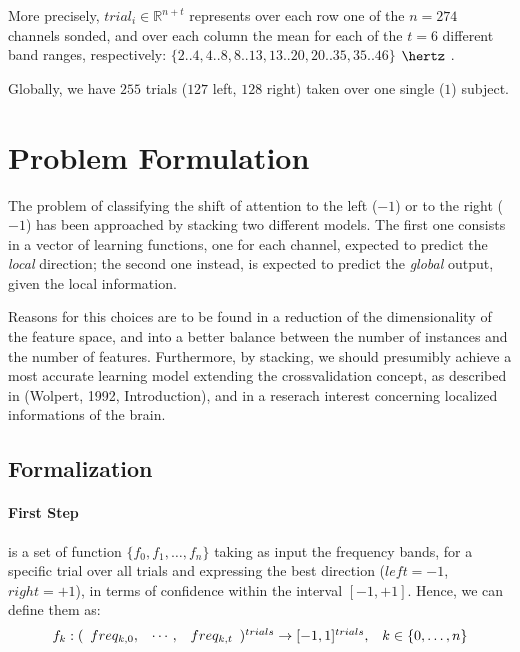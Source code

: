 \documentclass[10pt]{article}
\begin{document}
More precisely, $trial_i \in \mathbb{R} ^{n+t}$ represents over each row one of the $n=274$ channels sonded, and over each column the mean for each of the $t=6$ different band ranges, respectively:
$\{2..4, 4..8, 8..13, 13..20, 20..35, 35..46\}$ $\hertz$ .

Globally, we have $255$ trials ($127$ left, $128$ right) taken over one single ($1$) subject.  


\section{Problem Formulation}
The problem of classifying the shift of attention to
the left ($-1$) or to the right ($-1$) has been
approached by stacking\cite{Wolpert92} two different
models. The first one consists in a vector of
learning functions, one for each channel, expected to
predict the \emph{local} direction; the second one
instead, is expected to predict the \emph{global}
output, given the local information.

Reasons for this choices are to be found in a reduction of the dimensionality of the feature space, and into a better balance between the number of instances and the number of features.
Furthermore, by stacking, we should presumibly
achieve a most accurate learning model extending the crossvalidation concept, as described in (Wolpert, 1992, Introduction)\cite{Wolpert92}, and in a reserach interest concerning localized informations of the brain.


\subsection{Formalization} 

\paragraph{First Step} is a set of function 
$ \{f_0, f_1, \dots, f_n \}$ 
taking as input the frequency bands, for a specific trial over all trials and expressing the best direction ($left=-1$, $right=+1$), in terms of confidence within the interval $[-1, +1]$. Hence, we can define them as:
$$
\begin{array}{lr}
f_k: (\begin{array}{l l l} freq_{k, 0}, & \cdots, & freq_{k, t} \end{array})^{trials} \to [-1, 1]^{trials},
&
k \in \{0, \dots, n\}
\end{array}
$$ 
\end{document}
